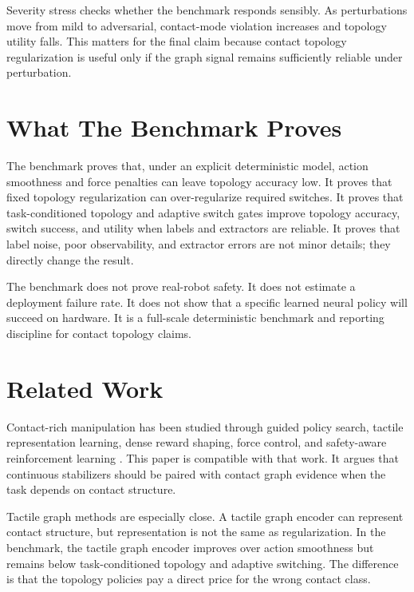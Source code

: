 \documentclass{article}
\begin{document}
\begin{table}[t]
\centering
\small
\resizebox{0.75\linewidth}{!}{}
\caption{Perturbation severity stress. Success and topology accuracy decline as perturbations become more severe, while contact-mode violation rises.}
\label{tab:severity}
\end{table}

Severity stress checks whether the benchmark responds sensibly. As perturbations move from mild to adversarial, contact-mode violation increases and topology utility falls. This matters for the final claim because contact topology regularization is useful only if the graph signal remains sufficiently reliable under perturbation.

\section{What The Benchmark Proves}

The benchmark proves that, under an explicit deterministic model, action smoothness and force penalties can leave topology accuracy low. It proves that fixed topology regularization can over-regularize required switches. It proves that task-conditioned topology and adaptive switch gates improve topology accuracy, switch success, and utility when labels and extractors are reliable. It proves that label noise, poor observability, and extractor errors are not minor details; they directly change the result.

The benchmark does not prove real-robot safety. It does not estimate a deployment failure rate. It does not show that a specific learned neural policy will succeed on hardware. It is a full-scale deterministic benchmark and reporting discipline for contact topology claims.

\section{Related Work}

Contact-rich manipulation has been studied through guided policy search, tactile representation learning, dense reward shaping, force control, and safety-aware reinforcement learning \citep{levine2015gps,beltran2021dense,zhu2022contactsafe,yang2023tacgnn}. This paper is compatible with that work. It argues that continuous stabilizers should be paired with contact graph evidence when the task depends on contact structure.

Tactile graph methods are especially close. A tactile graph encoder can represent contact structure, but representation is not the same as regularization. In the benchmark, the tactile graph encoder improves over action smoothness but remains below task-conditioned topology and adaptive switching. The difference is that the topology policies pay a direct price for the wrong contact class.
\end{document}
